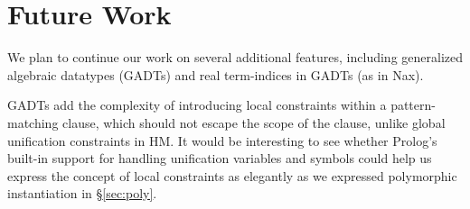\documentclass[runningheads,a4paper]{llncs}
\begin{document}
\section{Future Work}\label{sec:futwork}
We plan to continue our work on several additional features, including
generalized algebraic datatypes (GADTs) and real term-indices
in GADTs (as in Nax). %

GADTs add the complexity of introducing local constraints
within a pattern-matching clause, which should not escape
the scope of the clause, unlike global unification constraints in HM.
It would be interesting to see whether Prolog's built-in support for
handling unification variables and symbols could help us express
the concept of local constraints as elegantly as we expressed
polymorphic instantiation in \S\ref{sec:poly}.
\end{document}
